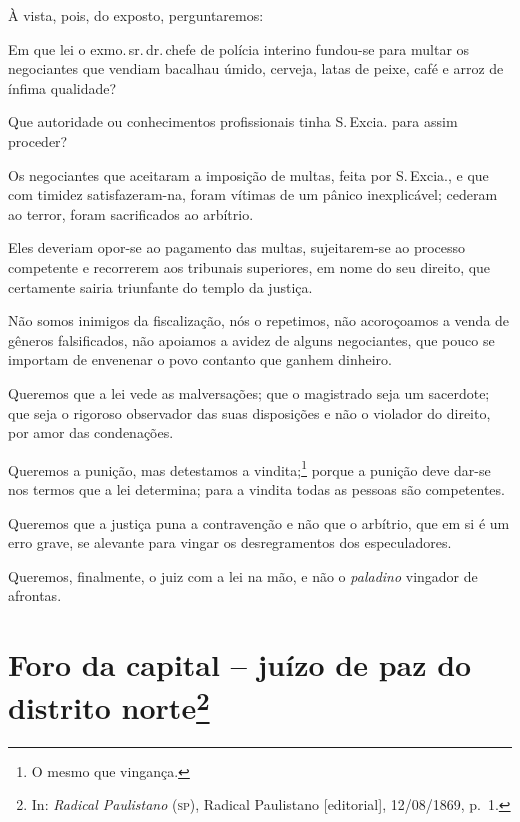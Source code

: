 À vista, pois, do exposto, perguntaremos:

Em que lei o exmo.\,sr.\,dr.\,chefe de polícia interino fundou-se para
multar os negociantes que vendiam bacalhau úmido, cerveja, latas de
peixe, café e arroz de ínfima qualidade?

Que autoridade ou conhecimentos profissionais tinha S.\,Excia. para assim
proceder?

Os negociantes que aceitaram a imposição de multas, feita por S.\,Excia.,
e que com timidez satisfazeram-na, foram vítimas de um pânico
inexplicável; cederam ao terror, foram sacrificados ao arbítrio.

Eles deveriam opor-se ao pagamento das multas, sujeitarem-se ao processo
competente e recorrerem aos tribunais superiores, em nome do seu
direito, que certamente sairia triunfante do templo da justiça.

Não somos inimigos da fiscalização, nós o repetimos, não acoroçoamos a
venda de gêneros falsificados, não apoiamos a avidez de alguns
negociantes, que pouco se importam de envenenar o povo contanto que
ganhem dinheiro.

Queremos que a lei vede as malversações; que o magistrado seja um
sacerdote; que seja o rigoroso observador das suas disposições e não o
violador do direito, por amor das condenações.

Queremos a punição, mas detestamos a vindita;\footnote{O mesmo que
  vingança.} porque a punição deve dar-se nos termos que a lei
determina; para a vindita todas as pessoas são competentes.

Queremos que a justiça puna a contravenção e não que o arbítrio, que em
si é um erro grave, se alevante para vingar os desregramentos dos
especuladores.

Queremos, finalmente, o juiz com a lei na mão, e não o \emph{paladino}
vingador de afrontas.

\chapter{Foro da capital -- juízo de paz do distrito norte\footnote{In:
  \emph{Radical Paulistano} (\textsc{sp}), Radical Paulistano {[}editorial{]},
  12/08/1869, p.~1.}}

